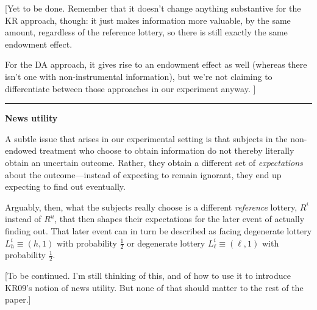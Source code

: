 \documentclass[11pt,reqno]{amsart}
\newcommand{\half}{\tfrac{1}{2}}
\newcommand{\brk}{\vspace*{0.8em}\hrule}
\begin{document}
{\color{red} 
[Yet to be done. Remember that it doesn't change anything substantive
for the KR approach, though: it just makes information more valuable, by the
same amount, regardless of the reference lottery, so there is still exactly the
same endowment effect.

For the DA approach, it gives rise to an endowment effect as well (whereas
there isn't one with non-instrumental information), but we're not
claiming to differentiate between those approaches in our experiment anyway.
]
}

\newpage
\brk

\begin{center}
\textbf{News utility}
\end{center}

A subtle issue that arises in our experimental setting is that subjects in the
non-endowed treatment who choose to obtain information do not thereby
literally obtain an uncertain outcome. Rather, they obtain a different set of
{\em expectations} about the outcome---instead of expecting to remain ignorant,
they end up expecting to find out eventually.

Arguably, then, what the subjects really choose is a different {\em reference}
lottery, $R^i$ instead of $R^u$, that then shapes their expectations for the
later event of actually finding out. That later event can in turn be described
as facing degenerate lottery $L^i_h \equiv (h,1)$ with probability $\half$ or
degenerate lottery $L^i_{\ell} \equiv (\ell,1)$ with probability $\half$.

{\color{red} 
[To be continued. I'm still thinking of this, and of how to use it to introduce
KR09's notion of news utility. But none of that should matter to the rest of
the paper.]
}



\end{document}
